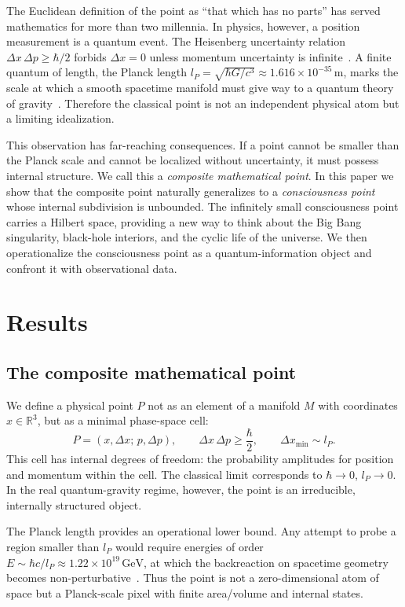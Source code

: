 \documentclass[11pt,a4paper]{article}
\theoremstyle{plain}
\begin{document}
The Euclidean definition of the point as ``that which has no parts'' has served mathematics for more than two millennia. In physics, however, a position measurement is a quantum event. The Heisenberg uncertainty relation $\Delta x\,\Delta p \ge \hbar/2$ forbids $\Delta x = 0$ unless momentum uncertainty is infinite~\cite{heisenberg1927}. A finite quantum of length, the Planck length $l_P=\sqrt{\hbar G/c^3}\approx 1.616\times10^{-35}\,\mathrm{m}$, marks the scale at which a smooth spacetime manifold must give way to a quantum theory of gravity~\cite{planck1899,kiefer2012}. Therefore the classical point is not an independent physical atom but a limiting idealization.

This observation has far-reaching consequences. If a point cannot be smaller than the Planck scale and cannot be localized without uncertainty, it must possess internal structure. We call this a \emph{composite mathematical point}. In this paper we show that the composite point naturally generalizes to a \emph{consciousness point} whose internal subdivision is unbounded. The infinitely small consciousness point carries a Hilbert space, providing a new way to think about the Big Bang singularity, black-hole interiors, and the cyclic life of the universe. We then operationalize the consciousness point as a quantum-information object and confront it with observational data.

\section{Results}

\subsection{The composite mathematical point}

We define a physical point $P$ not as an element of a manifold $M$ with coordinates $x\in\mathbb{R}^3$, but as a minimal phase-space cell:
\begin{equation}\label{eq:composite}
P=(x,\Delta x;\,p,\Delta p),\qquad \Delta x\,\Delta p\ge \frac{\hbar}{2},\qquad \Delta x_{\min}\sim l_P.
\end{equation}
This cell has internal degrees of freedom: the probability amplitudes for position and momentum within the cell. The classical limit corresponds to $\hbar\to0$, $l_P\to0$. In the real quantum-gravity regime, however, the point is an irreducible, internally structured object.

The Planck length provides an operational lower bound. Any attempt to probe a region smaller than $l_P$ would require energies of order $E\sim \hbar c/l_P\approx 1.22\times10^{19}\,\mathrm{GeV}$, at which the backreaction on spacetime geometry becomes non-perturbative~\cite{planck1899}. Thus the point is not a zero-dimensional atom of space but a Planck-scale pixel with finite area/volume and internal states.
\end{document}
